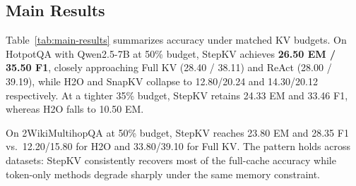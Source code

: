 \documentclass[11pt]{article}
\begin{document}
\subsection{Main Results}

Table~\ref{tab:main-results} summarizes accuracy under matched KV budgets.
On HotpotQA with Qwen2.5-7B at 50\% budget, StepKV achieves \textbf{26.50 EM / 35.50 F1}, closely approaching Full KV (28.40 / 38.11) and ReAct (28.00 / 39.19), while H2O and SnapKV collapse to 12.80/20.24 and 14.30/20.12 respectively.
At a tighter 35\% budget, StepKV retains 24.33 EM and 33.46 F1, whereas H2O falls to 10.50 EM.

On 2WikiMultihopQA at 50\% budget, StepKV reaches 23.80 EM and 28.35 F1 vs.\ 12.20/15.80 for H2O and 33.80/39.10 for Full KV.
The pattern holds across datasets: StepKV consistently recovers most of the full-cache accuracy while token-only methods degrade sharply under the same memory constraint.
\end{document}
